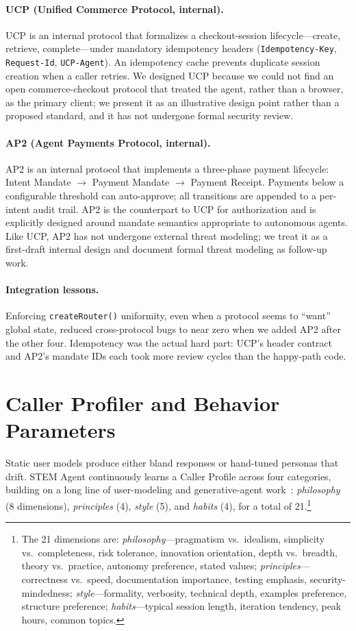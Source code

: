 \documentclass[11pt]{article}
\begin{document}
\paragraph{UCP (Unified Commerce Protocol, internal).} UCP is an internal protocol that formalizes a checkout-session lifecycle---create, retrieve, complete---under mandatory idempotency headers (\texttt{Idempotency-Key}, \texttt{Request-Id}, \texttt{UCP-Agent}). An idempotency cache prevents duplicate session creation when a caller retries. We designed UCP because we could not find an open commerce-checkout protocol that treated the agent, rather than a browser, as the primary client; we present it as an illustrative design point rather than a proposed standard, and it has not undergone formal security review.

\paragraph{AP2 (Agent Payments Protocol, internal).} AP2 is an internal protocol that implements a three-phase payment lifecycle: Intent Mandate $\rightarrow$ Payment Mandate $\rightarrow$ Payment Receipt. Payments below a configurable threshold can auto-approve; all transitions are appended to a per-intent audit trail. AP2 is the counterpart to UCP for authorization and is explicitly designed around mandate semantics appropriate to autonomous agents. Like UCP, AP2 has not undergone external threat modeling; we treat it as a first-draft internal design and document formal threat modeling as follow-up work.

\paragraph{Integration lessons.} Enforcing \texttt{createRouter()} uniformity, even when a protocol seems to ``want'' global state, reduced cross-protocol bugs to near zero when we added AP2 after the other four. Idempotency was the actual hard part: UCP's header contract and AP2's mandate IDs each took more review cycles than the happy-path code.

\section{Caller Profiler and Behavior Parameters}
\label{sec:profiler}

Static user models produce either bland responses or hand-tuned personas that drift. STEM Agent continuously learns a Caller Profile across four categories, building on a long line of user-modeling and generative-agent work~\citep{park2023generative}: \emph{philosophy} (8 dimensions), \emph{principles} (4), \emph{style} (5), and \emph{habits} (4), for a total of 21.\footnote{The 21 dimensions are: \textit{philosophy}---pragmatism vs.\ idealism, simplicity vs.\ completeness, risk tolerance, innovation orientation, depth vs.\ breadth, theory vs.\ practice, autonomy preference, stated values; \textit{principles}---correctness vs.\ speed, documentation importance, testing emphasis, security-mindedness; \textit{style}---formality, verbosity, technical depth, examples preference, structure preference; \textit{habits}---typical session length, iteration tendency, peak hours, common topics.}
\end{document}
